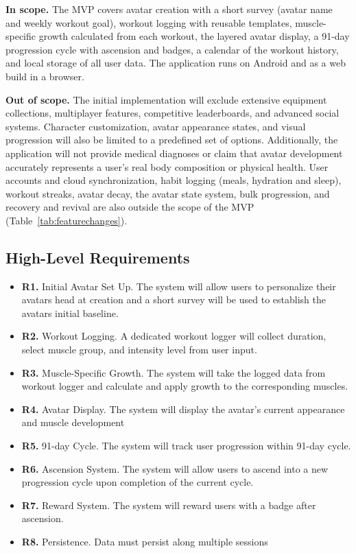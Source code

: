 \documentclass[11pt]{article}
\begin{document}
\textbf{In scope.}
The MVP covers avatar creation with a short survey (avatar name and weekly workout goal), workout logging with
reusable templates, muscle-specific growth calculated from each workout, the layered avatar display, a 91-day
progression cycle with ascension and badges, a calendar of the workout history, and local storage of all user data.
The application runs on Android and as a web build in a browser.

\medskip

\textbf{Out of scope.}
The initial implementation will exclude extensive equipment collections, multiplayer features, competitive leaderboards,
     and advanced social systems. Character customization, avatar appearance states, and visual progression will also be
        limited to a predefined set of options. Additionally, the application will not provide medical diagnoses or claim
     that avatar development accurately represents a user's real body composition or physical health. User accounts
     and cloud synchronization, habit logging (meals, hydration and sleep), workout streaks, avatar decay, the avatar
     state system, bulk progression, and recovery and revival are also outside the scope of the MVP
     (Table~\ref{tab:featurechanges}).



\subsection{High-Level Requirements}
\label{sec:requirements}
\begin{itemize}
    \item \textbf{R1.} Initial Avatar Set Up. The system will allow users to personalize their avatars head
        at creation and a short survey will be used to establish the avatars initial baseline.
    \item \textbf{R2.} Workout Logging. A dedicated workout logger will collect
        duration, select muscle group, and intensity level from user input.
    \item \textbf{R3.} Muscle-Specific Growth. The system will take the logged data from workout logger
        and calculate and apply growth to the corresponding muscles.
    \item \textbf{R4.} Avatar Display. The system will display the avatar's current appearance and muscle development
    \item \textbf{R5.} 91-day Cycle. The system will track user progression within 91-day cycle.
    \item \textbf{R6.} Ascension System. The system will allow users to ascend into a new progression cycle
        upon completion of the current cycle.
    \item \textbf{R7.} Reward System. The system will reward users with a badge after ascension.
    \item \textbf{R8.} Persistence. Data must persist along multiple sessions
\end{itemize}
\end{document}
